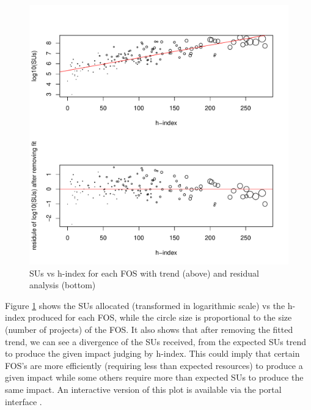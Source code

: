 \documentclass{sig-alternate}
\begin{document}
\begin{figure}[!htb] 
  \centering 
    \includegraphics[width=1.0\columnwidth]{images/05_alloc_vs_hindex_fos_sized_2in1.pdf} 
  \caption{SUs vs h-index for each FOS with trend (above) and residual analysis (bottom)}\label{F:alloc-vs-hindex-fos-sized} 
\end{figure} 

Figure \ref{F:alloc-vs-hindex-fos-sized} shows the SUs allocated (transformed in logarithmic scale) vs the h-index produced for each FOS, while the circle size is proportional to the size (number of projects) of the FOS. It also shows that after removing the fitted trend, we can see a divergence of the SUs received, from the expected SUs trend to produce the given impact judging by h-index. This could imply that certain FOS's are more efficiently (requiring less than expected resources) to produce a given impact while some others require more than expected SUs to produce the same impact. An interactive version of this plot is available via the portal interface \cite{www-tasdeviu}.
\end{document}

